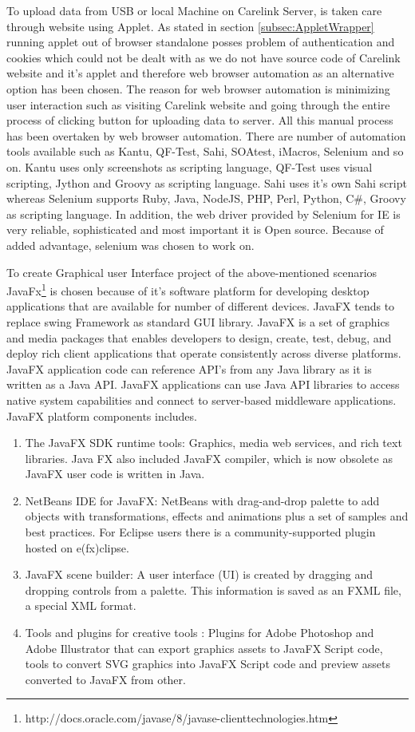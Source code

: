 \documentclass[article,type=msc,colorback,accentcolor=tud9c,twoside,11pt]{tudthesis}
\begin{document}
To upload data from USB or local Machine on Carelink Server, is taken care through website using Applet. As stated in section \ref{subsec:AppletWrapper} running applet out of browser standalone posses problem of authentication and cookies which could not be dealt with as we do not have source code of Carelink website and it's applet and therefore web browser automation as an alternative option has been chosen. The reason for web browser automation is minimizing user interaction such as visiting Carelink website and going through the entire process of clicking button for uploading data to server. All this manual process has been overtaken by web browser automation. There are number of automation tools available such as Kantu, QF-Test, Sahi, SOAtest, iMacros, Selenium and so on. Kantu uses only screenshots as scripting language, QF-Test uses visual scripting, Jython and Groovy as scripting language. Sahi uses it's own Sahi script whereas Selenium supports Ruby, Java, NodeJS, PHP, Perl, Python, C\#, Groovy as scripting language. In addition, the web driver provided by Selenium for IE is very reliable, sophisticated and most important it is Open source. Because of added advantage, selenium was chosen to work on.

To create Graphical user Interface project of the above-mentioned scenarios JavaFx\footnote{http://docs.oracle.com/javase/8/javase-clienttechnologies.htm} is chosen because of it's software platform for developing desktop applications that are available for number of different devices. JavaFX tends to replace swing Framework as standard GUI library. JavaFX is a set of graphics and media packages that enables developers to design, create, test, debug, and deploy rich client applications that operate consistently across diverse platforms. JavaFX application code can reference API's from any Java library as it is written as a Java API. JavaFX applications can use Java API libraries to access native system capabilities and connect to server-based middleware applications. JavaFX platform components includes.
\begin{enumerate}
\item The JavaFX SDK runtime tools: Graphics, media web services, and rich text libraries. Java FX  also included JavaFX compiler, which is now obsolete as JavaFX user code is written in Java.
\item NetBeans IDE for JavaFX: NetBeans with drag-and-drop palette to add objects with transformations, effects and animations plus a set of samples and best practices. For Eclipse users there is a community-supported plugin hosted on e(fx)clipse.
\item JavaFX scene builder: A user interface (UI) is created by dragging and dropping controls from a palette. This information is saved as an FXML file, a special XML format.
\item Tools and plugins for creative tools : Plugins for Adobe Photoshop and Adobe Illustrator that can export graphics assets to JavaFX Script code, tools to convert SVG graphics into JavaFX Script code and preview assets converted to JavaFX from other.
\end{enumerate}
\end{document}
